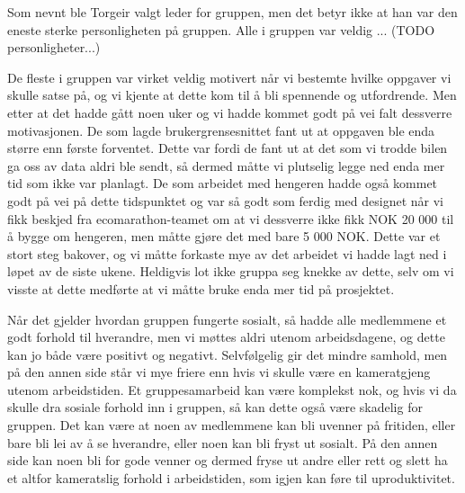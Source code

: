 Som nevnt ble Torgeir valgt leder for gruppen, men det betyr ikke at han var den eneste sterke personligheten på gruppen. Alle i gruppen var veldig ... (TODO personligheter...)

De fleste i gruppen var virket veldig motivert når vi bestemte hvilke oppgaver vi skulle satse på, og vi kjente at dette kom til å bli spennende og utfordrende. Men etter at det hadde gått noen uker og vi hadde kommet godt på vei falt dessverre motivasjonen.
De som lagde brukergrensesnittet fant ut at oppgaven ble enda større enn første forventet. Dette var fordi de fant ut at det som vi trodde bilen ga oss av data aldri ble sendt, så dermed måtte vi plutselig legge ned enda mer tid som ikke var planlagt. 
De som arbeidet med hengeren hadde også kommet godt på vei på dette tidspunktet og var så godt som ferdig med designet når vi fikk beskjed fra ecomarathon-teamet om at vi dessverre ikke fikk NOK 20 000 til å bygge om hengeren, men måtte gjøre det med bare 5 000 NOK. Dette var et stort steg bakover, og vi måtte forkaste mye av det arbeidet vi hadde lagt ned i løpet av de siste ukene. 
Heldigvis lot ikke gruppa seg knekke av dette, selv om vi visste at dette medførte at vi måtte bruke enda mer tid på prosjektet.

Når det gjelder hvordan gruppen fungerte sosialt, så hadde alle medlemmene et godt forhold til hverandre, men vi møttes aldri utenom arbeidsdagene, og dette kan jo både være positivt og negativt. 
Selvfølgelig gir det mindre samhold, men på den annen side står vi mye friere enn hvis vi skulle være en kameratgjeng utenom arbeidstiden. 
Et gruppesamarbeid kan være komplekst nok, og hvis vi da skulle dra sosiale forhold inn i gruppen, så kan dette også være skadelig for gruppen. 
Det kan være at noen av medlemmene kan bli uvenner på fritiden, eller bare bli lei av å se hverandre, eller noen kan bli fryst ut sosialt. 
På den annen side kan noen bli for gode venner og dermed fryse ut andre eller rett og slett ha et altfor kameratslig forhold i arbeidstiden, som igjen kan føre til uproduktivitet.
